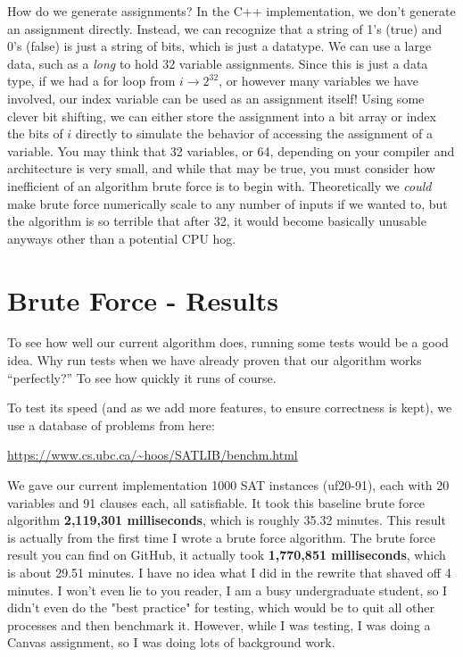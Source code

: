 How do we generate assignments? In the C++ implementation, we don't generate an assignment 
directly. Instead, we can recognize that a string of 1's (true) and 0's (false) is just a 
string of bits, which is just a datatype. We can use a large data, such as a \textit{long}
to hold 32 variable assignments. Since this is just a data type, if we had a for loop from 
$i \rightarrow 2^32$, or however many variables we have involved, our index variable can be used 
as an assignment itself! Using some clever bit shifting, we can either store the assignment into 
a bit array or index the bits of $i$ directly to simulate the behavior of accessing the assignment 
of a variable. You may think that 32 variables, or 64, depending on your compiler and architecture 
is very small, and while that may be true, you must consider how inefficient of an algorithm brute 
force is to begin with. Theoretically we \textit{could} make brute force numerically scale to any 
number of inputs if we wanted to, but the algorithm is so terrible that after 32, it would become 
basically unusable anyways other than a potential CPU hog.

\section{Brute Force - Results}

To see how well our current algorithm does, running some tests would be a
good idea. Why run tests when we have already proven that our algorithm
works ``perfectly?'' To see how quickly it runs of course.

To test its speed (and as we add more features, to ensure correctness is
kept), we use a database of problems from here:

\begin{center}
    \url{https://www.cs.ubc.ca/~hoos/SATLIB/benchm.html}
\end{center}

We gave our current implementation 1000 SAT instances (uf20-91), each
with 20 variables and 91 clauses each, all satisfiable. It took this baseline
brute force algorithm \textbf{2,119,301 milliseconds}, which is roughly 35.32
minutes. This result is actually from the first time I wrote a brute force 
algorithm. The brute force result you can find on GitHub, it actually took 
\textbf{1,770,851 milliseconds}, which is about 29.51 minutes. I have no idea what I 
did in the rewrite that shaved off 4 minutes. I won't even lie to you reader,
I am a busy undergraduate student, so I didn't even do the "best practice" for 
testing, which would be to quit all other processes and then benchmark it. However,
while I was testing, I was doing a Canvas assignment, so I was doing lots of 
background work.

